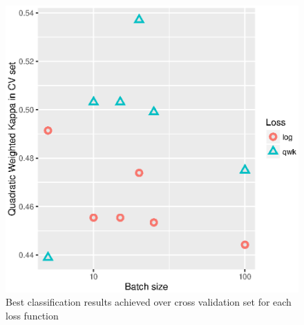 \documentclass{IOS-Book-Article}
\begin{document}
\begin{figure}[!htb]
	\centering
	\includegraphics[scale=.7]{best.eps}
	\caption{Best classification results achieved over cross validation set for each loss function}
	\label{fig:best}
\end{figure}
\end{document}
